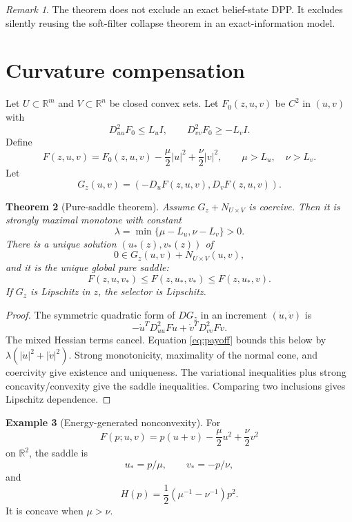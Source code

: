 \documentclass[11pt,reqno]{amsart}
\newtheorem{theorem}{Theorem}[section]
\theoremstyle{definition}
\newtheorem{example}[theorem]{Example}
\theoremstyle{remark}
\newtheorem{remark}[theorem]{Remark}
\newcommand{\R}{\mathbb R}
\newcommand{\abs}[1]{\left\lvert #1\right\rvert}
\begin{document}
\begin{remark}
The theorem does not exclude an exact belief-state DPP.  It excludes silently
reusing the soft-filter collapse theorem in an exact-information model.
\end{remark}

\section{Curvature compensation}\label{sec:curvature}

Let $U\subset\R^m$ and $V\subset\R^n$ be closed convex sets.  Let
$F_0(z,u,v)$ be $C^2$ in $(u,v)$ with
\[
 D_{uu}^2F_0\le L_uI,\qquad
 D_{vv}^2F_0\ge-L_vI.
\]
Define
\begin{equation}\label{eq:payoff}
 F(z,u,v)
 =
 F_0(z,u,v)-\frac\mu2\abs u^2+\frac\nu2\abs v^2,
 \qquad \mu>L_u,\quad\nu>L_v.
\end{equation}
Let
\[
 G_z(u,v)=(-D_uF(z,u,v),D_vF(z,u,v)).
\]

\begin{theorem}[Pure-saddle theorem]\label{thm:saddle}
Assume $G_z+N_{U\times V}$ is coercive.  Then it is strongly maximal monotone
with constant
\[
 \lambda=\min\{\mu-L_u,\nu-L_v\}>0.
\]
There is a unique solution $(u_*(z),v_*(z))$ of
\[
 0\in G_z(u,v)+N_{U\times V}(u,v),
\]
and it is the unique global pure saddle:
\[
 F(z,u,v_*)\le F(z,u_*,v_*)\le F(z,u_*,v).
\]
If $G_z$ is Lipschitz in $z$, the selector is Lipschitz.
\end{theorem}

\begin{proof}
The symmetric quadratic form of $DG_z$ in an increment
$(\dot u,\dot v)$ is
\[
 -\dot u^TD_{uu}^2F\dot u+\dot v^TD_{vv}^2F\dot v.
\]
The mixed Hessian terms cancel.  Equation \eqref{eq:payoff} bounds this below
by $\lambda(\abs{\dot u}^2+\abs{\dot v}^2)$.  Strong monotonicity, maximality
of the normal cone, and coercivity give existence and uniqueness.  The
variational inequalities plus strong concavity/convexity give the saddle
inequalities.  Comparing two inclusions gives Lipschitz dependence.
\end{proof}

\begin{example}[Energy-generated nonconvexity]\label{ex:energy}
For
\[
 F(p;u,v)
 =
 p(u+v)-\frac\mu2u^2+\frac\nu2v^2
\]
on $\R^2$, the saddle is
\[
 u_*=p/\mu,\qquad v_*=-p/\nu,
\]
and
\[
 H(p)=\frac12(\mu^{-1}-\nu^{-1})p^2.
\]
It is concave when $\mu>\nu$.
\end{example}
\end{document}

